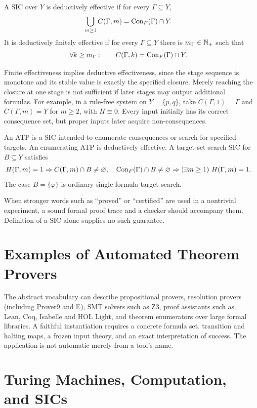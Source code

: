 \documentclass[11pt,letterpaper]{article}
\begin{document}
\begin{definition}
A SIC over $Y$ is deductively effective if for every $\Gamma\subseteq Y$,
\[
\bigcup_{m\ge1} C(\Gamma,m)=\operatorname{Con}_F(\Gamma)\cap Y.
\]
It is deductively finitely effective if for every $\Gamma\subseteq Y$ there is $m_\Gamma\in\mathbb N_{+}$ such that
\[
\forall k\ge m_\Gamma:\qquad C(\Gamma,k)=\operatorname{Con}_F(\Gamma)\cap Y.
\]
\end{definition}
Finite effectiveness implies deductive effectiveness, since the stage sequence is monotone and its stable value is exactly the specified closure. Merely reaching the closure at one stage is not sufficient if later stages may output additional formulas. For example, in a rule-free system on $Y=\{p,q\}$, take $C(\Gamma,1)=\Gamma$ and $C(\Gamma,m)=Y$ for $m\ge2$, with $H\equiv0$. Every input initially has its correct consequence set, but proper inputs later acquire non-consequences.

\begin{definition}
An ATP is a SIC intended to enumerate consequences or search for specified targets. An enumerating ATP is deductively effective. A target-set search SIC for $B\subseteq Y$ satisfies
\[
H(\Gamma,m)=1\Rightarrow C(\Gamma,m)\cap B\ne\varnothing,
\quad \Con_F(\Gamma)\cap B\ne\varnothing\Rightarrow (\exists m\ge1)\ H(\Gamma,m)=1.
\]
The case $B=\{\varphi\}$ is ordinary single-formula target search.
\end{definition}
When stronger words such as ``proved'' or ``certified'' are used in a nontrivial experiment, a sound formal proof trace and a checker should accompany them. Definition of a SIC alone supplies no such guarantee.

\section{Examples of Automated Theorem Provers}
The abstract vocabulary can describe propositional provers, resolution provers (including Prover9 and E), SMT solvers such as Z3, proof assistants such as Lean, Coq, Isabelle and HOL Light, and theorem enumerators over large formal libraries. A faithful instantiation requires a concrete formula set, transition and halting maps, a frozen input theory, and an exact interpretation of success. The application is not automatic merely from a tool's name.

\section{Turing Machines, Computation, and SICs}
\end{document}
